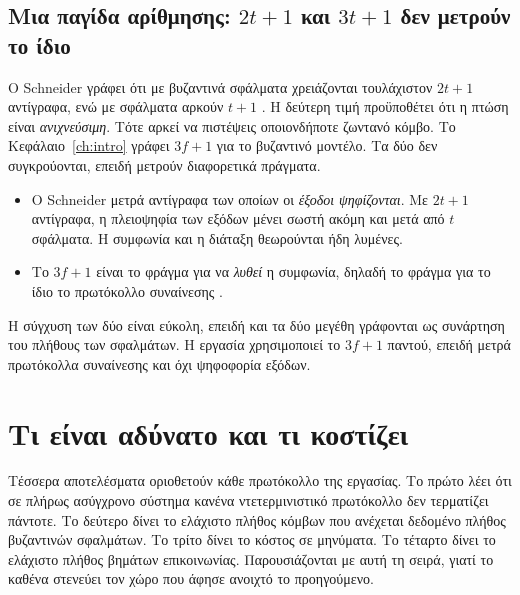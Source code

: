 \subsection{Μια παγίδα αρίθμησης: $2t{+}1$ και $3t{+}1$ δεν μετρούν το
ίδιο}

Ο Schneider γράφει ότι με βυζαντινά σφάλματα χρειάζονται τουλάχιστον
$2t{+}1$ αντίγραφα, ενώ με σφάλματα  αρκούν $t{+}1$
\cite{schneider1990implementing}. Η δεύτερη τιμή προϋποθέτει ότι η πτώση
είναι \emph{ανιχνεύσιμη}. Τότε αρκεί να πιστέψεις οποιονδήποτε ζωντανό
κόμβο. Το Κεφάλαιο~\ref{ch:intro} γράφει $3f{+}1$ για το βυζαντινό
μοντέλο. Τα δύο δεν συγκρούονται, επειδή μετρούν διαφορετικά πράγματα.

\begin{itemize}
  \item Ο Schneider μετρά αντίγραφα των οποίων οι \emph{έξοδοι
  ψηφίζονται}. Με $2t{+}1$ αντίγραφα, η πλειοψηφία των εξόδων μένει
  σωστή ακόμη και μετά από $t$ σφάλματα. Η συμφωνία και η διάταξη
  θεωρούνται ήδη λυμένες.
  \item Το $3f{+}1$ είναι το φράγμα για να \emph{λυθεί} η συμφωνία,
  δηλαδή το φράγμα για το ίδιο το πρωτόκολλο συναίνεσης
  \cite{pease1980reaching}.
\end{itemize}

Η σύγχυση των δύο είναι εύκολη, επειδή και τα δύο μεγέθη γράφονται ως
συνάρτηση του πλήθους των σφαλμάτων. Η εργασία χρησιμοποιεί το $3f{+}1$
παντού, επειδή μετρά πρωτόκολλα συναίνεσης και όχι ψηφοφορία εξόδων.

\section{Τι είναι αδύνατο και τι κοστίζει}
\label{sec:bounds}

Τέσσερα αποτελέσματα οριοθετούν κάθε πρωτόκολλο της εργασίας. Το πρώτο
λέει ότι σε πλήρως ασύγχρονο σύστημα κανένα ντετερμινιστικό πρωτόκολλο
δεν τερματίζει πάντοτε. Το δεύτερο δίνει το ελάχιστο πλήθος κόμβων που
ανέχεται δεδομένο πλήθος βυζαντινών σφαλμάτων. Το τρίτο δίνει το κόστος
σε μηνύματα. Το τέταρτο δίνει το ελάχιστο πλήθος βημάτων επικοινωνίας.
Παρουσιάζονται με αυτή τη σειρά, γιατί το καθένα στενεύει τον χώρο που
άφησε ανοιχτό το προηγούμενο.

